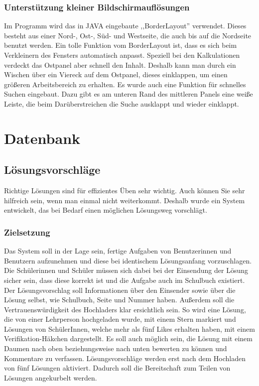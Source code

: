 \documentclass[12pt]{report}
\begin{document}
\section{Unterstützung kleiner Bildschirmauflösungen}
Im Programm wird das in JAVA eingebaute ,,BorderLayout'' verwendet. Dieses besteht aus einer Nord-, Ost-, Süd- und Westseite, die auch bis auf die Nordseite benutzt werden. Ein tolle Funktion vom BorderLayout ist, dass es sich beim Verkleinern des Fensters automatisch anpasst. Speziell bei den Kalkulationen verdeckt das Ostpanel aber schnell den Inhalt. Deshalb kann man durch ein Wischen über ein Viereck auf dem Ostpanel, dieses einklappen, um einen größeren Arbeitsbereich zu erhalten. Es wurde auch eine Funktion für schnelles Suchen eingebaut. Dazu gibt es am unteren Rand des mittleren Panels eine weiße Leiste, die beim Darüberstreichen die Suche ausklappt und wieder einklappt.


\part{Datenbank}


\chapter{Lösungsvorschläge}
 
Richtige Lösungen sind für effizientes Üben sehr wichtig. Auch können Sie sehr hilfreich sein, wenn man einmal nicht weiterkommt. Deshalb wurde ein System entwickelt, das bei Bedarf einen möglichen Lösungsweg vorschlägt.

\section{Zielsetzung}
Das System soll in der Lage sein, fertige Aufgaben von Benutzerinnen und Benutzern aufzunehmen und diese bei identischem Lösungsanfang vorzuschlagen. Die Schülerinnen und Schüler müssen sich dabei bei der Einsendung der Lösung sicher sein, dass diese korrekt ist und die Aufgabe auch im Schulbuch existiert. Der Lösungsvorschlag soll Informationen über den Einsender sowie über die Lösung selbst, wie Schulbuch, Seite und Nummer haben. Außerdem soll die Vertrauenswürdigkeit des Hochladers klar ersichtlich sein. So wird eine Lösung, die von einer Lehrperson hochgeladen wurde, mit einem Stern markiert und Lösungen von SchülerInnen, welche mehr als fünf Likes erhalten haben, mit einem Verifikation-Häkchen dargestellt. Es soll auch möglich sein, die Lösung mit einem Daumen nach oben beziehungsweise nach unten bewerten zu können und Kommentare zu verfassen. Lösungsvorschläge werden erst nach dem Hochladen von fünf Lösungen aktiviert. Dadurch soll die Bereitschaft zum Teilen von Lösungen angekurbelt werden.
\end{document}
